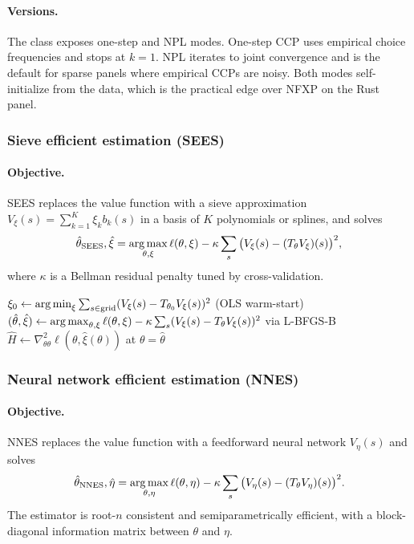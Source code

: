 \paragraph{Versions.} The  class exposes one-step and NPL modes. One-step CCP uses empirical choice frequencies and stops at $k = 1$. NPL iterates to joint convergence and is the default for sparse panels where empirical CCPs are noisy. Both modes self-initialize from the data, which is the practical edge over NFXP on the Rust panel.

\subsubsection{Sieve efficient estimation (SEES)}

\paragraph{Objective.} SEES \citep{luo2024sees} replaces the value function with a sieve approximation $V_\xi(s) = \sum_{k=1}^{K} \xi_k b_k(s)$ in a basis of $K$ polynomials or splines, and solves
\begin{equation}
\hat\theta_{\mathrm{SEES}}, \hat\xi = \operatorname*{arg\,max}_{\theta, \xi} \ell(\theta, \xi) - \kappa \sum_s \big( V_\xi(s) - (T_\theta V_\xi)(s) \big)^2,
\label{eq:sees}
\end{equation}
where $\kappa$ is a Bellman residual penalty tuned by cross-validation.

\begin{algorithm}[H]
\SetAlgoLined
$\xi_0 \leftarrow \operatorname*{arg\,min}_\xi \sum_{s \in \text{grid}} (V_\xi(s) - T_{\theta_0} V_\xi(s))^2$ \quad (OLS warm-start)\;
$(\hat\theta, \hat\xi) \leftarrow \operatorname*{arg\,max}_{\theta, \xi} \ell(\theta, \xi) - \kappa \sum_s (V_\xi(s) - T_\theta V_\xi(s))^2$ via L-BFGS-B\;
$\hat H \leftarrow \nabla^2_{\theta\theta} \ell(\theta, \hat\xi(\theta))$ at $\theta = \hat\theta$\;
\caption{Sieve joint maximum likelihood}
\end{algorithm}

\subsubsection{Neural network efficient estimation (NNES)}

\paragraph{Objective.} NNES \citep{nguyen2025nnes} replaces the value function with a feedforward neural network $V_\eta(s)$ and solves
\begin{equation}
\hat\theta_{\mathrm{NNES}}, \hat\eta = \operatorname*{arg\,max}_{\theta, \eta} \ell(\theta, \eta) - \kappa \sum_s \big( V_\eta(s) - (T_\theta V_\eta)(s) \big)^2.
\label{eq:nnes}
\end{equation}
The estimator is root-$n$ consistent and semiparametrically efficient, with a block-diagonal information matrix between $\theta$ and $\eta$.

